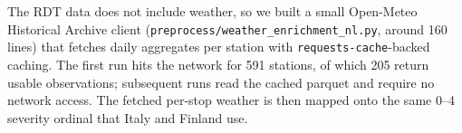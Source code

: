 The RDT data does not include weather, so we built a small Open-Meteo Historical Archive client (\texttt{preprocess/weather\_enrichment\_nl.py}, around 160 lines) that fetches daily aggregates per station with \texttt{requests-cache}-backed caching. The first run hits the network for 591 stations, of which 205 return usable observations; subsequent runs read the cached parquet and require no network access. The fetched per-stop weather is then mapped onto the same 0--4 severity ordinal that Italy and Finland use.
